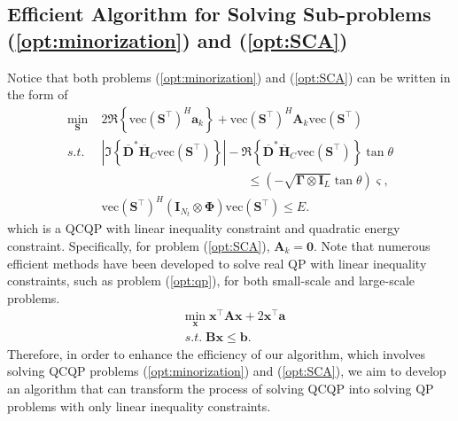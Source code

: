 \documentclass[lettersize,journal]{IEEEtran}
\begin{document}
\subsection{Efficient Algorithm for Solving Sub-problems (\ref{opt:minorization}) and (\ref{opt:SCA})}
\label{sec:efficient_qp}
Notice that both problems (\ref{opt:minorization}) and (\ref{opt:SCA}) can be written in the form of 
\begin{equation}
\label{opt:energy_qp}
\begin{aligned}
    \underset{\mathbf{S}}{\min} &\;
    2\Re\left\{\text{vec}(\mathbf{S}^{\top})^H\mathbf{a}_k\right\}+\text{vec}(\mathbf{S}^{\top})^H\mathbf{A}_k\text{vec}(\mathbf{S}^{\top}) \\
    s.t. &\;
    \left| \Im\left\{\overline{\mathbf{D}}^{*}\overline{\mathbf{H}}_C\text{vec}(\mathbf{S}^{\top})\right\} \right| - \Re\left\{\overline{\mathbf{D}}^{*}\overline{\mathbf{H}}_C\text{vec}(\mathbf{S}^{\top})\right\}\tan\theta
    \\ &\qquad\qquad\qquad\qquad\qquad\qquad
    \leq (-\sqrt{\mathbf{\Gamma}\otimes\mathbf{I}_L}\tan\theta)\bm{\varsigma},\\
    &\; \text{vec}(\mathbf{S}^{\top})^H(\mathbf{I}_{N_t}\otimes\mathbf{\Phi})\text{vec}(\mathbf{S}^{\top})\leq E.
\end{aligned}
\end{equation}
which is a QCQP with linear inequality constraint and quadratic energy constraint. Specifically, for problem (\ref{opt:SCA}), $\mathbf{A}_k=\mathbf{0}$. Note that numerous efficient methods have been developed to solve real QP with linear inequality constraints, such as problem (\ref{opt:qp}), for both small-scale and large-scale problems.
\begin{equation}
\label{opt:qp}
\begin{aligned}
    &\underset{\mathbf{x}}{\mathrm{min}} \;
    \mathbf{x}^{\top}\mathbf{A}\mathbf{x} + 2\mathbf{x}^{\top}\mathbf{a} \\
    &s.t.\;
    \mathbf{B}\mathbf{x} \leq \mathbf{b}.
\end{aligned}
\end{equation}
Therefore, in order to enhance the efficiency of our algorithm, which involves solving QCQP problems (\ref{opt:minorization}) and (\ref{opt:SCA}), we aim to develop an algorithm that can transform the process of solving QCQP into solving QP problems with only linear inequality constraints.
\end{document}
